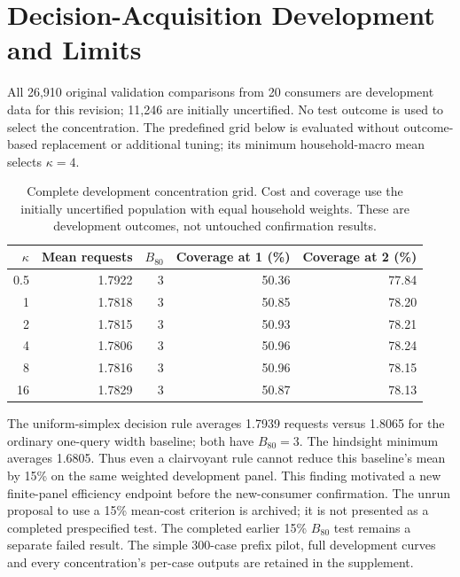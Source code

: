 \documentclass[12pt]{article}
\begin{document}
\section{Decision-Acquisition Development and Limits}\label{app:decision-development}
All 26,910 original validation comparisons from 20 consumers are development
data for this revision; 11,246 are initially uncertified. No test outcome
is used to select the concentration. The predefined grid below is evaluated
without outcome-based replacement or additional tuning; its minimum
household-macro mean selects $\kappa=4$.

\begin{table}[htbp]
\centering\small
\caption{Complete development concentration grid. Cost and coverage use
the initially uncertified population with equal household weights. These
are development outcomes, not untouched confirmation results.}
\label{tab:decision-development}
\begin{tabular}{rrrrr}
\toprule
$\kappa$ & Mean requests & $B_{80}$ & Coverage at 1 (\%) & Coverage at 2 (\%)\\
\midrule
0.5 & 1.7922 & 3 & 50.36 & 77.84\\
1 & 1.7818 & 3 & 50.85 & 78.20\\
2 & 1.7815 & 3 & 50.93 & 78.21\\
4 & 1.7806 & 3 & 50.96 & 78.24\\
8 & 1.7816 & 3 & 50.96 & 78.15\\
16 & 1.7829 & 3 & 50.87 & 78.13\\
\bottomrule
\end{tabular}
\end{table}

The uniform-simplex decision rule averages 1.7939 requests versus 1.8065
for the ordinary one-query width baseline; both have $B_{80}=3$.
The hindsight minimum averages 1.6805. Thus even a clairvoyant rule cannot
reduce this baseline's mean by 15\% on the same weighted development panel.
This finding motivated a new finite-panel efficiency endpoint before the
new-consumer confirmation. The unrun proposal to use a 15\% mean-cost
criterion is archived; it is not presented as a completed prespecified test.
The completed earlier 15\% $B_{80}$ test remains a separate failed result.
The simple 300-case prefix pilot, full development curves and every
concentration's per-case outputs are retained in the supplement.
\end{document}
